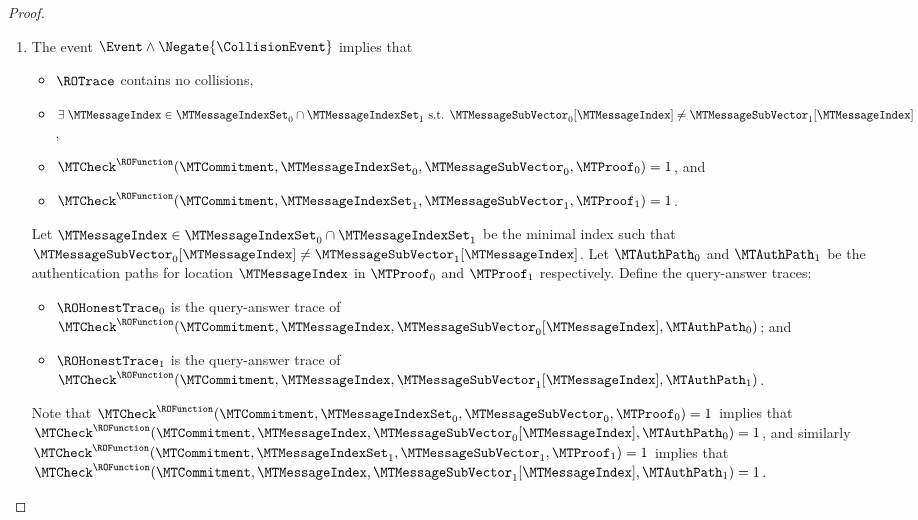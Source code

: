 \begin{proof}
\begin{enumerate}
  \item The event $\Event \land \Negate{\CollisionEvent}$ implies that
\begin{itemize}[nolistsep]
  \item $\ROTrace$ contains no collisions,
  \item $\exists\;\MTMessageIndex \in \MTMessageIndexSet_{0} \cap \MTMessageIndexSet_{1} \text{ s.t. } \MTMessageSubVector_{0}[\MTMessageIndex] \neq \MTMessageSubVector_{1}[\MTMessageIndex]$,
  \item $\MTCheck^{\ROFunction}(\MTCommitment,\MTMessageIndexSet_{0},\MTMessageSubVector_{0},\MTProof_{0})=1$, and
  \item $\MTCheck^{\ROFunction}(\MTCommitment,\MTMessageIndexSet_{1},\MTMessageSubVector_{1},\MTProof_{1})=1$.
\end{itemize}
Let $\MTMessageIndex \in \MTMessageIndexSet_{0} \cap \MTMessageIndexSet_{1}$ be the minimal index such that $\MTMessageSubVector_{0}[\MTMessageIndex] \neq \MTMessageSubVector_{1}[\MTMessageIndex]$. Let $\MTAuthPath_{0}$ and $\MTAuthPath_{1}$ be the authentication paths for location $\MTMessageIndex$ in $\MTProof_{0}$ and $\MTProof_{1}$ respectively. Define the query-answer traces:
\begin{itemize}[noitemsep]
  \item $\ROHonestTrace_{0}$ is the query-answer trace of $\MTCheck^{\ROFunction}(\MTCommitment,\MTMessageIndex,\MTMessageSubVector_{0}[\MTMessageIndex],\MTAuthPath_{0})$; and
  \item $\ROHonestTrace_{1}$ is the query-answer trace of $\MTCheck^{\ROFunction}(\MTCommitment,\MTMessageIndex,\MTMessageSubVector_{1}[\MTMessageIndex],\MTAuthPath_{1})$.
\end{itemize}
Note that $\MTCheck^{\ROFunction}(\MTCommitment,\MTMessageIndexSet_{0},\MTMessageSubVector_{0},\MTProof_{0})=1$ implies that $\MTCheck^{\ROFunction}(\MTCommitment,\MTMessageIndex,\MTMessageSubVector_{0}[\MTMessageIndex],\MTAuthPath_{0})=1$, and similarly $\MTCheck^{\ROFunction}(\MTCommitment,\MTMessageIndexSet_{1},\MTMessageSubVector_{1},\MTProof_{1})=1$ implies that $\MTCheck^{\ROFunction}(\MTCommitment,\MTMessageIndex,\MTMessageSubVector_{1}[\MTMessageIndex],\MTAuthPath_{1})=1$.


\end{enumerate}
\end{proof}
